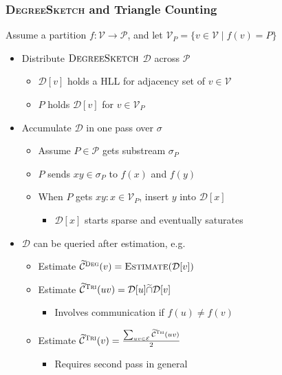 \documentclass{beamer}
\newcommand{\algoname}[1]{\textnormal{\textsc{#1}}}
\begin{document}



\begin{frame}
\frametitle{\algoname{DegreeSketch} and Triangle Counting}



Assume a partition $f : \mathcal{V} \rightarrow \mathcal{P}$, and let $\mathcal{V}_P = \{v \in \mathcal{V} \mid f(v) = P\}$
\begin{itemize}
	\item Distribute $\algoname{DegreeSketch}$ $\mathcal{D}$ across $\mathcal{P}$
	\begin{itemize}
		\item $\mathcal{D}[v]$ holds a \algoname{HLL} for adjacency set of $v \in \mathcal{V}$
		\item $P$ holds $\mathcal{D}[v]$ for $v \in \mathcal{V}_P$
	\end{itemize}
	\item Accumulate $\mathcal{D}$ in one pass over $\sigma$
	\begin{itemize}
		\item Assume $P \in \mathcal{P}$	gets substream $\sigma_P$
		\item $P$ sends $xy \in \sigma_P$ to $f(x)$ and $f(y)$
		\item When $P$ gets $xy : x \in \mathcal{V}_P$, insert $y$ into $\mathcal{D}[x]$
		\begin{itemize}
			\item $\mathcal{D}[x]$ starts sparse and eventually saturates
		\end{itemize}
	\end{itemize}
	\item $\mathcal{D}$ can be queried after estimation, e.g.
	\begin{itemize}
		\item Estimate $\widetilde{\mathcal{C}}^{\algoname{Deg}}(v)  = \algoname{Estimate}(\mathcal{D}[v])$
		\item Estimate $\widetilde{\mathcal{C}}^{\algoname{Tri}}(uv) = \mathcal{D}[u] \widetilde{\cap} \mathcal{D}[v]$
		\begin{itemize}
			\item Involves communication if $f(u) \neq f(v)$
		\end{itemize}
		\item Estimate $\widetilde{\mathcal{C}}^{\algoname{Tri}}(v) = \frac{\sum_{uv \in \mathcal{E}} \widetilde{\mathcal{C}}^{\algoname{Tri}}(uv)}{2}$
		\begin{itemize}
			\item Requires second pass in general
		\end{itemize}
	\end{itemize}
\end{itemize}


\end{frame}
\end{document}
